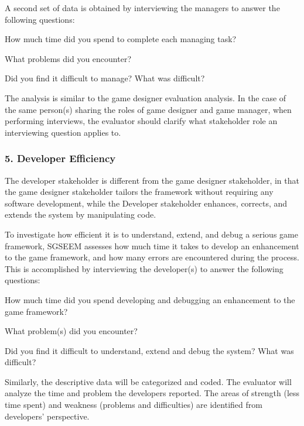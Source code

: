 \documentclass{sigchi}
\begin{document}
A second set of data is obtained by interviewing the managers to answer the following
questions:

\begin{compactitem}
\item How much time did you spend to complete each managing task?
\item What problems did you encounter?
\item Did you find it difficult to manage? What was difficult?
\end{compactitem}

The analysis is similar to the game designer evaluation analysis. In the case of the same
person(s) sharing the roles of game designer and game manager, when performing interviews, the
evaluator should clarify what stakeholder role an interviewing question applies to.

\subsubsection{5. Developer Efficiency}

The developer stakeholder is different from the game designer stakeholder, in that the
game designer stakeholder tailors the framework without requiring any software
development, while the Developer stakeholder enhances, corrects, and extends the system by
manipulating code. 

To investigate how efficient it is to understand, extend, and debug a serious game
framework, SGSEEM assesses how much time it takes to develop an
enhancement to the game framework, and how many errors are encountered
during the process. This is accomplished by interviewing the developer(s) to
answer the following questions:

\begin{compactitem}
\item How much time did you spend developing and debugging an
  enhancement to the game framework?
\item What problem(s) did you encounter?
\item Did you find it difficult to understand, extend and debug the
  system? What was difficult?
\end{compactitem}

Similarly, the descriptive data will be categorized and coded. The evaluator will analyze
 the time and problem the developers reported.  The areas of strength (less time spent) and weakness (problems and difficulties) are identified from developers' perspective.
\end{document}

